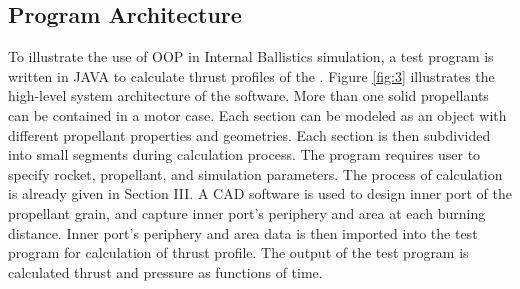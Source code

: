 \documentclass[conference]{IEEEtran}
\begin{document}
 
\subsection{Program Architecture}
To illustrate the use of OOP in Internal Ballistics simulation, a test program is written in JAVA to calculate thrust profiles of the . Figure {\ref{fig:3}} illustrates the high-level system architecture of the software. More than one solid propellants can be contained in a motor case. Each section can be modeled as an object with different propellant properties and geometries. Each section is then subdivided into small segments during calculation process. The program requires user to specify rocket, propellant, and simulation parameters. The process of calculation is already given in Section III. A CAD software is used to design inner port of the propellant grain, and capture inner port's periphery and area at each burning distance. Inner port's periphery and area data is then imported into the test program for calculation of thrust profile. The output of the test program is calculated thrust and pressure as functions of time. 
\end{document}
